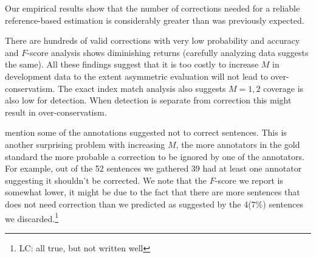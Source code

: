 \documentclass[letter,11pt]{article}
\newcommand{\oa}[1]{\footnote{\color{red}OA: #1}}
\newcommand{\lc}[1]{\footnote{\color{blue}LC: #1}}
\begin{document}
Our empirical results show that the number of corrections needed for a reliable reference-based estimation
is considerably greater than was previously expected. {\color{red} There are hundreds of valid corrections with very low probability and accuracy and $F$-score analysis shows diminishing returns (carefully analyzing  data suggests the same). All these findings suggest that it is too costly to increase $M$ in development data to the extent asymmetric evaluation will not lead to over-conservatism. The exact index match analysis also suggests $M=1,2$ coverage is also low for detection. When detection is separate from correction this might result in over-conservatism. 

 mention some of the annotations suggested not to correct sentences. This is another surprising problem with increasing $M$, the more annotators in the gold standard the more probable a correction to be ignored by one of the annotators. For example, out of the 52 sentences we gathered 39 had at least one annotator suggesting it shouldn't be corrected. We note that the $F$-score we report is somewhat lower, it might be due to the fact that there are more sentences that does not need correction than we predicted as suggested by the 4(7\%) sentences we discarded.\lc{all true, but not written well} } 


\end{document}
